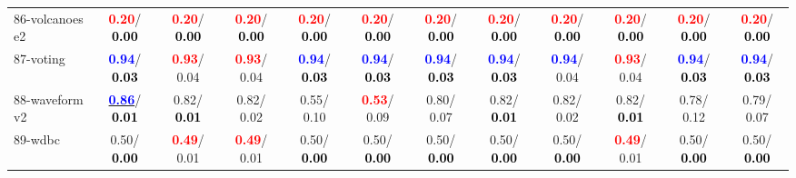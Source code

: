 \begin{table}[h]
\begin{center}
{\begin{tabular}{lc|c|c|c|c|c|c|c|c|c|c}
86-volcanoes e2 & \textcolor{red}{\textbf{  0.20}}/\textcolor{black}{\textbf{  0.00}} & \textcolor{red}{\textbf{  0.20}}/\textcolor{black}{\textbf{  0.00}} & \textcolor{red}{\textbf{  0.20}}/\textcolor{black}{\textbf{  0.00}} & \textcolor{red}{\textbf{  0.20}}/\textcolor{black}{\textbf{  0.00}} & \textcolor{red}{\textbf{  0.20}}/\textcolor{black}{\textbf{  0.00}} & \textcolor{red}{\textbf{  0.20}}/\textcolor{black}{\textbf{  0.00}} & \textcolor{red}{\textbf{  0.20}}/\textcolor{black}{\textbf{  0.00}} & \textcolor{red}{\textbf{  0.20}}/\textcolor{black}{\textbf{  0.00}} & \textcolor{red}{\textbf{  0.20}}/\textcolor{black}{\textbf{  0.00}} & \textcolor{red}{\textbf{  0.20}}/\textcolor{black}{\textbf{  0.00}} & \textcolor{red}{\textbf{  0.20}}/\textcolor{black}{\textbf{  0.00}} \\
87-voting & \textcolor{blue}{\textbf{  0.94}}/\textcolor{black}{\textbf{  0.03}} & \textcolor{red}{\textbf{  0.93}}/  0.04 & \textcolor{red}{\textbf{  0.93}}/  0.04 & \textcolor{blue}{\textbf{  0.94}}/\textcolor{black}{\textbf{  0.03}} & \textcolor{blue}{\textbf{  0.94}}/\textcolor{black}{\textbf{  0.03}} & \textcolor{blue}{\textbf{  0.94}}/\textcolor{black}{\textbf{  0.03}} & \textcolor{blue}{\textbf{  0.94}}/\textcolor{black}{\textbf{  0.03}} & \textcolor{blue}{\textbf{  0.94}}/  0.04 & \textcolor{red}{\textbf{  0.93}}/  0.04 & \textcolor{blue}{\textbf{  0.94}}/\textcolor{black}{\textbf{  0.03}} & \textcolor{blue}{\textbf{  0.94}}/\textcolor{black}{\textbf{  0.03}} \\
88-waveform v2 & \underline{\textcolor{blue}{\textbf{  0.86}}}/\textcolor{black}{\textbf{  0.01}} &   0.82/\textcolor{black}{\textbf{  0.01}} &   0.82/  0.02 &   0.55/  0.10 & \textcolor{red}{\textbf{  0.53}}/  0.09 &   0.80/  0.07 &   0.82/\textcolor{black}{\textbf{  0.01}} &   0.82/  0.02 &   0.82/\textcolor{black}{\textbf{  0.01}} &   0.78/  0.12 &   0.79/  0.07 \\
89-wdbc &   0.50/\textcolor{black}{\textbf{  0.00}} & \textcolor{red}{\textbf{  0.49}}/  0.01 & \textcolor{red}{\textbf{  0.49}}/  0.01 &   0.50/\textcolor{black}{\textbf{  0.00}} &   0.50/\textcolor{black}{\textbf{  0.00}} &   0.50/\textcolor{black}{\textbf{  0.00}} &   0.50/\textcolor{black}{\textbf{  0.00}} &   0.50/\textcolor{black}{\textbf{  0.00}} & \textcolor{red}{\textbf{  0.49}}/  0.01 &   0.50/\textcolor{black}{\textbf{  0.00}} &   0.50/\textcolor{black}{\textbf{  0.00}} \\

\end{tabular}}
\end{center}
\end{table}
